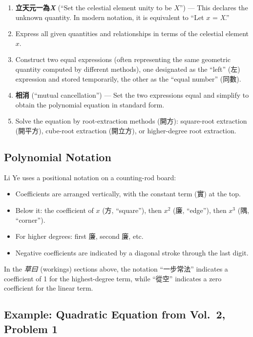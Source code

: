 \documentclass[11pt,a4paper]{article}
\begin{document}
\begin{enumerate}[leftmargin=2em]
  \item \textbf{立天元一為\textit{X}} (``Set the celestial element unity to be $X$'') --- This declares the unknown quantity. In modern notation, it is equivalent to ``Let $x$ = \textit{X}.''
  
  \item Express all given quantities and relationships in terms of the celestial element $x$.
  
  \item Construct two equal expressions (often representing the same geometric quantity computed by different methods), one designated as the ``left'' (左) expression and stored temporarily, the other as the ``equal number'' (同數).
  
  \item \textbf{相消} (``mutual cancellation'') --- Set the two expressions equal and simplify to obtain the polynomial equation in standard form.
  
  \item Solve the equation by root-extraction methods (開方): square-root extraction (開平方), cube-root extraction (開立方), or higher-degree root extraction.
\end{enumerate}

\subsection{Polynomial Notation}

Li Ye uses a positional notation on a counting-rod board:
\begin{itemize}[leftmargin=2em]
  \item Coefficients are arranged vertically, with the constant term (實) at the top.
  \item Below it: the coefficient of $x$ (方, ``square''), then $x^2$ (廉, ``edge''), then $x^3$ (隅, ``corner'').
  \item For higher degrees: first 廉, second 廉, etc.
  \item Negative coefficients are indicated by a diagonal stroke through the last digit.
\end{itemize}

In the \textit{草曰} (workings) sections above, the notation ``一步常法'' indicates a coefficient of 1 for the highest-degree term, while ``從空'' indicates a zero coefficient for the linear term.

\subsection{Example: Quadratic Equation from Vol.\ 2, Problem 1}
\end{document}
